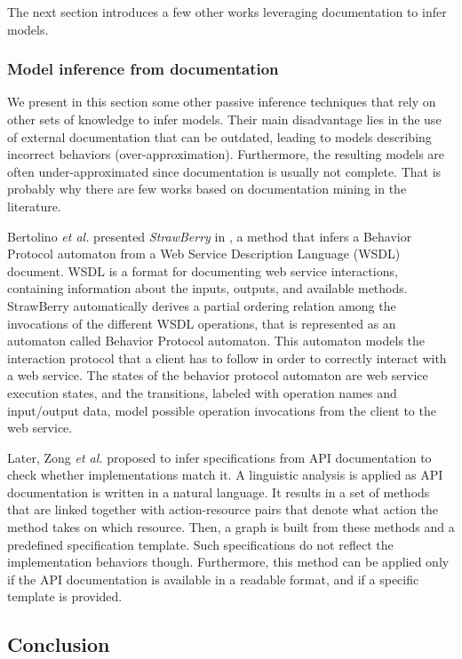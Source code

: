 The next section introduces a few other works leveraging
documentation to infer models.

\subsubsection{Model inference from documentation}
\label{sec:passive-others}

We present in this section some other passive inference
techniques that rely on other sets of knowledge to infer models.
Their main disadvantage lies in the use of external documentation
that can be outdated, leading to models describing incorrect
behaviors (over-approximation). Furthermore, the resulting models
are often under-approximated since documentation is usually not
complete. That is probably why there are few works based on
documentation mining in the literature.

Bertolino \emph{et al.} presented \textit{StrawBerry} in
\cite{Bertolino:2009:ASB:1595696.1595719}, a method that infers a
Behavior Protocol automaton from a Web Service Description
Language (WSDL) document.  WSDL is a format for documenting web
service interactions, containing information about the inputs,
outputs, and available methods. StrawBerry automatically derives a
partial ordering relation among the invocations of the different
WSDL operations, that is represented as an automaton called
Behavior Protocol automaton.  This automaton models the
interaction protocol that a client has to follow in order to
correctly interact with a web service.  The states of the
behavior protocol automaton are web service execution states, and
the transitions, labeled with operation names and input/output
data, model possible operation invocations from the client to the
web service.

Later, Zong \emph{et al.} \cite{ZhongZXM11} proposed to infer
specifications from API documentation to check whether
implementations match it. A linguistic analysis is applied as API
documentation is written in a natural language. It results in a
set of methods that are linked together with action-resource
pairs that denote what action the method takes on which resource.
Then, a graph is built from these methods and a predefined
specification template. Such specifications do not reflect the
implementation behaviors though. Furthermore, this method can be
applied only if the API documentation is available in a readable
format, and if a specific template is provided.

\subsection{Conclusion}

